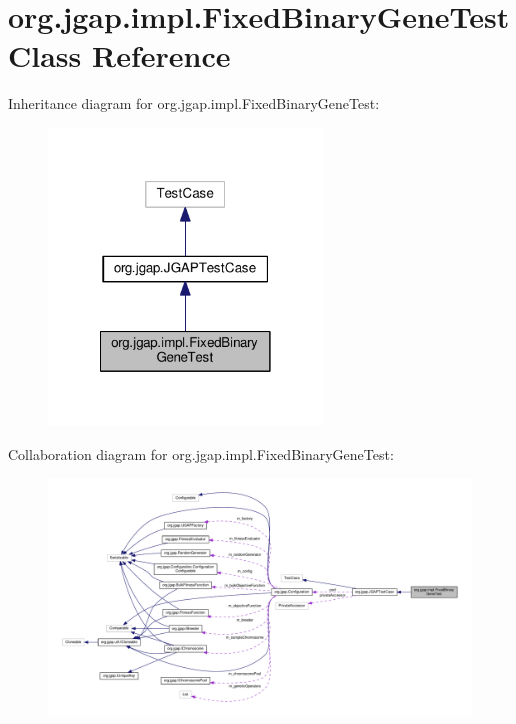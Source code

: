 \hypertarget{classorg_1_1jgap_1_1impl_1_1_fixed_binary_gene_test}{\section{org.\-jgap.\-impl.\-Fixed\-Binary\-Gene\-Test Class Reference}
\label{classorg_1_1jgap_1_1impl_1_1_fixed_binary_gene_test}
}


Inheritance diagram for org.\-jgap.\-impl.\-Fixed\-Binary\-Gene\-Test\-:
\nopagebreak
\begin{figure}[H]
\begin{center}
\leavevmode
\includegraphics[width=206pt]{classorg_1_1jgap_1_1impl_1_1_fixed_binary_gene_test__inherit__graph}
\end{center}
\end{figure}


Collaboration diagram for org.\-jgap.\-impl.\-Fixed\-Binary\-Gene\-Test\-:
\nopagebreak
\begin{figure}[H]
\begin{center}
\leavevmode
\includegraphics[width=350pt]{classorg_1_1jgap_1_1impl_1_1_fixed_binary_gene_test__coll__graph}
\end{center}
\end{figure}
